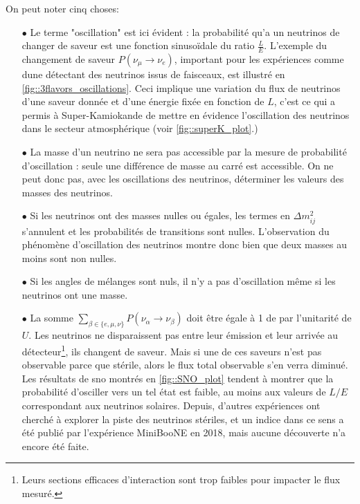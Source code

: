         On peut noter cinq choses:
        \begin{itemize}
          \item[$\bullet$] Le terme "oscillation" est ici évident : la probabilité qu'a un neutrinos de changer de saveur est une fonction sinusoïdale du ratio $\frac{L}{E}$. L'exemple du changement de saveur $P(\nu_{\mu}\to\nu_e)$, important pour les expériences comme \gls{dune} détectant des neutrinos issus de faisceaux, est illustré en \autoref{fig::3flavors_oscillations}. Ceci implique une variation du flux de neutrinos d'une saveur donnée et d'une énergie fixée en fonction de $L$, c'est ce qui a permis à Super-Kamiokande de mettre en évidence l'oscillation des neutrinos dans le secteur atmosphérique (voir \autoref{fig::superK_plot}.)
          \item[$\bullet$] La masse d'un neutrino ne sera pas accessible par la mesure de probabilité d'oscillation : seule une différence de masse au carré est accessible. On ne peut donc pas, avec les oscillations des neutrinos, déterminer les valeurs des masses des neutrinos.
          \item[$\bullet$] Si les neutrinos ont des masses nulles ou égales, les termes en $\Delta m_{ij}^2$ s'annulent et les probabilités de transitions sont nulles. L'observation du phénomène d'oscillation des neutrinos montre donc bien que deux masses au moins sont non nulles.
          \item[$\bullet$] Si les angles de mélanges sont nuls, il n'y a pas d'oscillation même si les neutrinos ont une masse.
          \item[$\bullet$] La somme $\sum_{\beta\in\{e,\mu,\nu\}}P(\nu_{\alpha}\to\nu_{\beta})$ doit être égale à 1 de par l'unitarité de $U$. Les neutrinos ne disparaissent pas entre leur émission et leur arrivée au détecteur\footnote{Leurs sections efficaces d'interaction sont trop faibles pour impacter le flux mesuré.}, ils changent de saveur. Mais si une de ces saveurs n'est pas observable parce que stérile, alors le flux total observable s'en verra diminué. Les résultats de \gls{sno} montrés en \autoref{fig::SNO_plot} tendent à montrer que la probabilité d'osciller vers un tel état est faible, au moins aux valeurs de $L/E$ correspondant aux neutrinos solaires. Depuis, d'autres expériences ont cherché à explorer la piste des neutrinos stériles, et un indice dans ce sens a été publié par l'expérience MiniBooNE\cite{Arevalo2018} en 2018, mais aucune découverte n'a encore été faite.
        \end{itemize}




